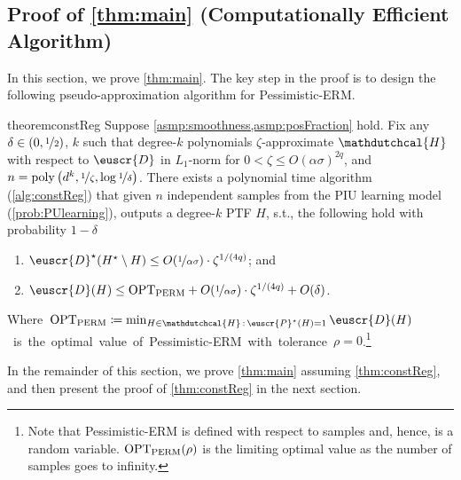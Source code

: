 \documentclass[11pt]{article}
\theoremstyle{plain}
\theoremstyle{definition}
\theoremstyle{remark}
\newcommand{\sinparen}[1]{(#1)}
\newcommand{\inparen}[1]{\left(#1\right)}
\newcommand{\sfrac}[2]{{#1/#2}}
\newcommand{\nfrac}[2]{\nicefrac{#1}{#2}}
\newcommand{\opt}{\ensuremath{\mathrm{OPT}}}
\newcommand{\poly}{\mathrm{poly}}
\newcommand{\customcal}[1]{\euscr{#1}}
\newcommand{\cD}{\customcal{D}}
\newcommand{\cP}{\customcal{P}}
\newcommand{\hypo}[1]{\mathdutchcal{#1}}
\newcommand{\hyH}{\hypo{H}}
\newcommand{\pERM}{Pessimistic-ERM}
\newcommand{\optset}{{H^\star}}
\newcommand{\cDtrue}{\cD^\star}
\newcommand{\cDgiven}{\cD}
\newcommand{\cPtrue}{\cP^\star}
\newcommand{\nL}{L}
\begin{document}
    \subsection{Proof of \cref{thm:main} (Computationally Efficient Algorithm)}
        \label{sec:computationalEfficiency}
        In this section, we prove \cref{thm:main}.
        The key step in the proof is to design the following pseudo-approximation algorithm for \pERM{}.
        \begin{restatable}[]{theorem}{constReg}
            \label{thm:constReg}
            Suppose \cref{asmp:smoothness,asmp:posFraction} hold.
            Fix any $\delta\in (0,\nfrac{1}{2})$, $k$ such that degree-$k$ polynomials $\zeta$-approximate $\hyH$ with respect to $\cDgiven$ in $\nL_1$-norm for $0<\zeta\leq O\sinparen{{\alpha\sigma}{}}^{2q}$, and $n=\poly\inparen{d^k, \nfrac{1}{\zeta}, \log{\nfrac{1}{\delta}}}$.
            There exists a polynomial time algorithm (\cref{alg:constReg}) that given $n$ independent samples from the PIU learning model (\cref{prob:PUlearning}), outputs a degree-$k$ PTF $H$, s.t., the following hold with probability $1-\delta$
            \begin{enumerate}
                \item $\cDtrue\sinparen{\optset \setminus H}\leq O\sinparen{\nfrac{1}{\alpha\sigma}} \cdot \zeta^{\sfrac{1}{(4q)}}$; and 
                \item $\cD(H)\leq \opt_{\rm PERM} +
                    O\sinparen{\nfrac{1}{\alpha\sigma}}\cdot {\zeta^{\sfrac{1}{(4q)}}}+O(\delta)$. 
            \end{enumerate}
            \mbox{Where $\opt_{\rm PERM}\coloneqq \min_{H\in \hyH \,:\, \cPtrue(H)=1} \cD(H)$ is the optimal value of \pERM{} with tolerance $\rho=0$.}\footnote{Note that \pERM{} is defined with respect to samples and, hence, is a random variable. $\opt_{\rm PERM}(\rho)$ is the limiting optimal value as the number of samples goes to infinity.}
        \end{restatable}
        In the remainder of this section, we prove \cref{thm:main} assuming \cref{thm:constReg}, and then present the proof of \cref{thm:constReg} in the next section.
\end{document}
